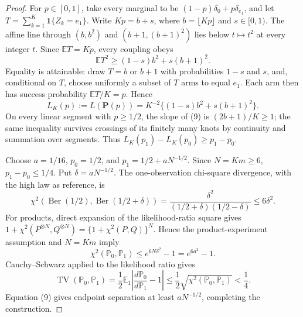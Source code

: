 \documentclass{article}
\begin{document}
\begin{proof}
For \(p\in[0,1]\), take every marginal to be \((1-p)\delta_0+p\delta_{e_1}\), and let \(T=\sum_{k=1}^K\mathbf 1\{Z_k=e_1\}\). Write \(Kp=b+s\), where \(b=\lfloor Kp\rfloor\) and \(s\in[0,1)\). The affine line through \((b,b^2)\) and \((b+1,(b+1)^2)\) lies below \(t\mapsto t^2\) at every integer \(t\). Since \(\mathbb ET=Kp\), every coupling obeys
\[
\mathbb ET^2\ge(1-s)b^2+s(b+1)^2. \tag{8}
\]
Equality is attainable: draw \(T=b\) or \(b+1\) with probabilities \(1-s\) and \(s\), and, conditional on \(T\), choose uniformly a subset of \(T\) arms to equal \(e_1\). Each arm then has success probability \(\mathbb ET/K=p\). Hence
\[
L_K(p):=L(\mathbf P(p))=K^{-2}\{(1-s)b^2+s(b+1)^2\}. \tag{9}
\]
On every linear segment with \(p\ge1/2\), the slope of (9) is \((2b+1)/K\ge1\); the same inequality survives crossings of its finitely many knots by continuity and summation over segments. Thus \(L_K(p_1)-L_K(p_0)\ge p_1-p_0\).

Choose \(a=1/16\), \(p_0=1/2\), and \(p_1=1/2+aN^{-1/2}\). Since \(N=Km\ge6\), \(p_1-p_0\le1/4\). Put \(\delta=aN^{-1/2}\). The one-observation chi-square divergence, with the high law as reference, is
\[
\chi^2(\operatorname{Ber}(1/2),\operatorname{Ber}(1/2+\delta))
=\frac{\delta^2}{(1/2+\delta)(1/2-\delta)}
\le6\delta^2.
\]
For products, direct expansion of the likelihood-ratio square gives \(1+\chi^2(P^{\otimes N},Q^{\otimes N})=\{1+\chi^2(P,Q)\}^N\). Hence the product-experiment assumption and \(N=Km\) imply
\[
\chi^2(\mathbb P_0,\mathbb P_1)\le e^{6N\delta^2}-1=e^{6a^2}-1.
\]
Cauchy--Schwarz applied to the likelihood ratio gives
\[
\operatorname{TV}(\mathbb P_0,\mathbb P_1)
=\frac12\mathbb E_1\left|\frac{d\mathbb P_0}{d\mathbb P_1}-1\right|
\le\frac12\sqrt{\chi^2(\mathbb P_0,\mathbb P_1)}
<\frac14.
\]
Equation (9) gives endpoint separation at least \(aN^{-1/2}\), completing the construction.
\end{proof}
\end{document}
